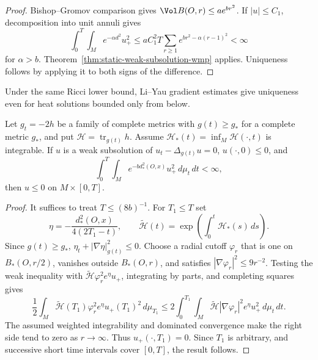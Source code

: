 \begin{proof}
\sketch
{}
Bishop--Gromov comparison gives $\Vol B(O,r)\leq ae^{br^2}$.  If $|u|\leq C_1$,
decomposition into unit
annuli gives
\[
\int_0^T\!\int_M e^{-\alpha d^2}u_+^2
\leq aC_1^2T\sum_{r\geq1}e^{br^2-\alpha(r-1)^2}<\infty
\]
for $\alpha>b$.  Theorem~\ref{thm:static-weak-subsolution-wmp} applies.
Uniqueness follows by applying it to both signs of the difference.
\end{proof}

\begin{remark}
\label{rem:li-yau-below-bounded-uniqueness}
Under the same Ricci lower bound, Li--Yau gradient estimates give uniqueness
even for heat solutions bounded only from below.
\end{remark}

\begin{theorem}
\label{thm:evolving-metric-weak-subsolution-wmp}
Let $g_t=-2h$ be a family of complete metrics with $g(t)\geq g_*$ for a
complete metric $g_*$, and put $\mathcal H=\operatorname{tr}_{g(t)}h$.  Assume
$\mathcal H_*(t)=\inf_M\mathcal H(\cdot,t)$ is integrable.  If $u$ is a weak
subsolution of $u_t-\Delta_{g(t)}u=0$, $u(\cdot,0)\leq0$, and
\[
\int_0^T\!\int_Me^{-bd_*^2(O,x)}u_+^2\,d\mu_t\,dt<\infty,
\]
then $u\leq0$ on $M\times[0,T]$.
\end{theorem}

\begin{proof}
\sketch
{}
It suffices to treat $T\leq(8b)^{-1}$.  For $T_1\leq T$ set
\[
\eta=-\frac{d_*^2(O,x)}{4(2T_1-t)},\qquad
\widetilde{\mathcal H}(t)=
\exp\!\left(\int_0^t\mathcal H_*(s)\,ds\right).
\]
Since $g(t)\geq g_*$,
$\eta_t+|\nabla\eta|_{g(t)}^2\leq0$.  Choose a radial cutoff $\varphi_r$ that
is one on $B_*(O,r/2)$, vanishes outside $B_*(O,r)$, and satisfies
$|\nabla\varphi_r|^2\leq9r^{-2}$.  Testing the weak inequality with
$\widetilde{\mathcal H}\varphi_r^2e^\eta u_+$, integrating by parts, and
completing squares gives
\[
\frac12\int_M\widetilde{\mathcal H}(T_1)\varphi_r^2e^\eta
u_+(T_1)^2\,d\mu_{T_1}
\leq2\int_0^{T_1}\!\int_M
\widetilde{\mathcal H}|\nabla\varphi_r|^2e^\eta u_+^2\,d\mu_t\,dt.
\]
The assumed weighted integrability and dominated convergence make the right
side tend to zero as $r\to\infty$.  Thus $u_+(\cdot,T_1)=0$.  Since $T_1$ is
arbitrary, and successive short time intervals cover $[0,T]$, the result
follows.
\end{proof}

